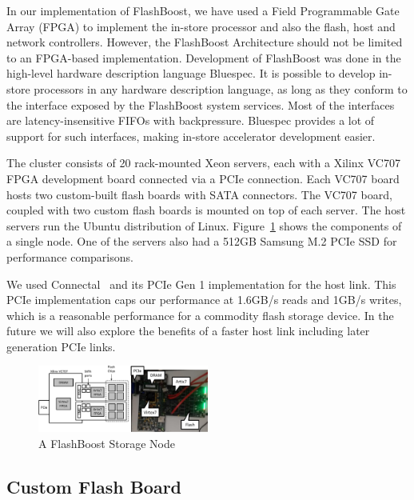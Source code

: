 In our implementation of FlashBoost, we have used a Field Programmable Gate
Array (FPGA) to implement the in-store processor and also the flash, host and
network controllers. However, the FlashBoost Architecture should not be limited
to an FPGA-based implementation.  Development of FlashBoost was done in the
high-level hardware description language Bluespec. It is possible to develop in-store processors in any hardware description language, as long as they conform to the interface exposed by the FlashBoost system services. Most of the interfaces are latency-insensitive FIFOs with backpressure. Bluespec provides a lot of support for such interfaces, making in-store accelerator development easier.

The cluster consists of 20 rack-mounted Xeon servers, each with a Xilinx
VC707 FPGA development board connected via a PCIe connection. Each VC707 board
hosts two custom-built flash boards with SATA connectors. The VC707 board,
coupled with two custom flash boards is mounted on top of each server.
The host servers run the Ubuntu distribution of Linux.
Figure~\ref{fig:bluedbmnode} shows the components of a single node.
One of the servers also had a 512GB Samsung M.2 PCIe SSD for performance
comparisons.

We used Connectal~\cite{connectal} and its PCIe Gen 1 implementation for the
host link. This PCIe implementation caps our performance at 1.6GB/s reads and
1GB/s writes, which is a reasonable performance for a commodity flash storage
device. In the future we will also explore the benefits of a faster host link
including later generation PCIe links.

\begin{figure}[ht]
	\begin{center}
	\includegraphics[width=0.5\textwidth]{figures/racknode-crop.pdf}
	\caption{A FlashBoost Storage Node}
	\label{fig:bluedbmnode}
	\end{center}
\end{figure}


\subsection{Custom Flash Board}

